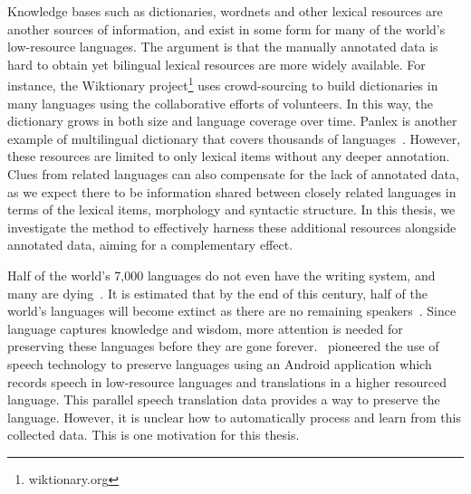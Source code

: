 \documentclass[12pt,twoside,final,hidelinks]{ltthesis}
\theoremstyle{definition}
\begin{document}
Knowledge bases such as dictionaries, wordnets and 
other lexical resources are another sources of information, and exist in some form for many of the world's low-resource languages. The argument is that the 
manually annotated data is hard to obtain yet bilingual lexical resources are more widely available. For instance, the Wiktionary 
project\footnote{wiktionary.org} uses crowd-sourcing to build dictionaries in many languages using the collaborative efforts of volunteers. In this way, the 
dictionary grows in both size and language coverage over time. Panlex is another example of multilingual dictionary that covers thousands of 
languages~\cite{Kamholz14}. However, these resources are limited to only lexical items without any deeper annotation. Clues from related languages can also compensate for the lack of 
annotated data, as we expect there to be information shared between closely related languages in terms of the lexical items, morphology and syntactic structure. In 
this thesis, we investigate the method to effectively harness these additional resources alongside annotated data, aiming for a complementary effect. 

% 
Half of the world's 7,000 languages do not even have the writing system, and many are dying~\cite{lewis2009}. It is estimated that by the end of this century, 
half of the world's languages will become extinct as there are no remaining speakers~\cite{crystal2002language}. Since language captures knowledge and 
wisdom, more attention is needed for preserving these languages before they are gone forever.~ pioneered the use of speech technology to 
preserve languages using an Android application which records speech in low-resource languages and translations in a higher 
resourced language. This parallel speech translation data provides a way to preserve the language. However, it is unclear how to automatically process and learn from this collected 
data. This is one motivation for this thesis. 
\end{document}
